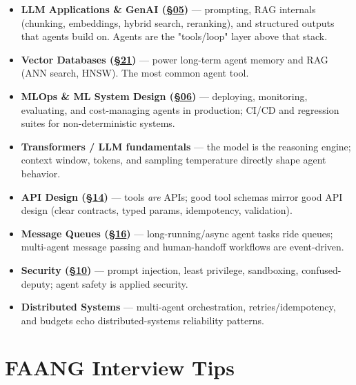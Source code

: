 \documentclass[11pt]{article}
\providecommand{\tightlist}{\setlength{\itemsep}{1pt}\setlength{\parskip}{0pt}}
\begin{document}
\begin{itemize}
\tightlist
\item
  \textbf{LLM Applications \& GenAI (\hyperlink{section.05}{\textcolor{acc}{§05}})} --- prompting, RAG internals (chunking, embeddings, hybrid search, reranking), and structured outputs that agents build on. Agents are the "tools/loop" layer above that stack.
\item
  \textbf{Vector Databases (\hyperlink{section.21}{\textcolor{acc}{§21}})} --- power long-term agent memory and RAG (ANN search, HNSW). The most common agent tool.
\item
  \textbf{MLOps \& ML System Design (\hyperlink{section.06}{\textcolor{acc}{§06}})} --- deploying, monitoring, evaluating, and cost-managing agents in production; CI/CD and regression suites for non-deterministic systems.
\item
  \textbf{Transformers / LLM fundamentals} --- the model is the reasoning engine; context window, tokens, and sampling temperature directly shape agent behavior.
\item
  \textbf{API Design (\hyperlink{section.14}{\textcolor{acc}{§14}})} --- tools \emph{are} APIs; good tool schemas mirror good API design (clear contracts, typed params, idempotency, validation).
\item
  \textbf{Message Queues (\hyperlink{section.16}{\textcolor{acc}{§16}})} --- long-running/async agent tasks ride queues; multi-agent message passing and human-handoff workflows are event-driven.
\item
  \textbf{Security (\hyperlink{section.10}{\textcolor{acc}{§10}})} --- prompt injection, least privilege, sandboxing, confused-deputy; agent safety is applied security.
\item
  \textbf{Distributed Systems} --- multi-agent orchestration, retries/idempotency, and budgets echo distributed-systems reliability patterns.
\end{itemize}

\section{FAANG Interview Tips}\label{faang-interview-tips}
\end{document}
